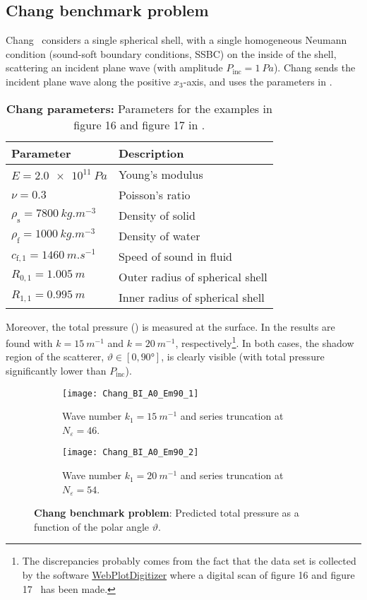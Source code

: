 \subsection{Chang benchmark problem} 
Chang~\cite{Chang1994soa} considers a single spherical shell, with a single homogeneous Neumann condition (sound-soft boundary conditions, SSBC) on the inside of the shell, scattering an incident plane wave (with amplitude $P_{\mathrm{inc}}=\SI{1}{Pa}$). Chang sends the incident plane wave along the positive $x_3$-axis, and uses the parameters in .
\begin{table}
	\centering
	\caption{\textbf{Chang parameters:} Parameters for the examples in figure 16 and figure 17 in \cite{Chang1994soa}.}
	\label{Tab1:Chang}
	\begin{tabular}{l l}
		\toprule
		Parameter & Description\\
		\midrule
		$E = \SI{2.0e11}{Pa}$ & Young's modulus\\
		$\nu = 0.3$ & Poisson's ratio\\
		$\rho_{\mathrm{s}} = \SI{7800}{kg.m^{-3}}$ & Density of solid\\
		$\rho_{\mathrm{f}} = \SI{1000}{kg.m^{-3}}$ & Density of water\\
		$c_{\mathrm{f},1} = \SI{1460}{m.s^{-1}}$ & Speed of sound in fluid\\
		$R_{0,1} = \SI{1.005}{m}$ & Outer radius of spherical shell\\
		$R_{1,1} = \SI{0.995}{m}$ & Inner radius of spherical shell\\
		\bottomrule
	\end{tabular}
\end{table}
Moreover, the total pressure () is measured at the surface. In  the results are found with $k=\SI{15}{m^{-1}}$ and $k=\SI{20}{m^{-1}}$, respectively\footnote{The discrepancies probably comes from the fact that the data set is collected by the software \href{https://automeris.io/WebPlotDigitizer/}{WebPlotDigitizer} where a digital scan of figure 16 and figure 17~\cite[pp. 32-33]{Chang1994soa} has been made.}. In both cases, the shadow region of the scatterer, $\vartheta\in [0,\ang{90}]$, is clearly visible (with total pressure significantly lower than $P_{\mathrm{inc}}$).
\begin{figure}
	\centering
	\begin{subfigure}[t]{\textwidth}
		\centering
		\texttt{[image: Chang\_BI\_A0\_Em90\_1]}
		\caption{Wave number $k_1=\SI{15}{m^{-1}}$ and series truncation at $N_\varepsilon = 46$.}
		\label{Fig1:Chang1}
	\end{subfigure}
	\par\bigskip
	\begin{subfigure}[t]{\textwidth}
		\centering
		\texttt{[image: Chang\_BI\_A0\_Em90\_2]}
		\caption{Wave number $k_1=\SI{20}{m^{-1}}$ and series truncation at $N_\varepsilon = 54$.}
		\label{Fig1:Chang2}
	\end{subfigure}
	\caption{\textbf{Chang benchmark problem}: Predicted total pressure as a function of the polar angle $\vartheta$.}
\end{figure}

